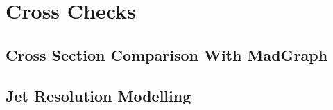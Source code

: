 \section{Cross Checks}
\subsection{Cross Section Comparison With MadGraph}
\subsection{Jet Resolution Modelling}